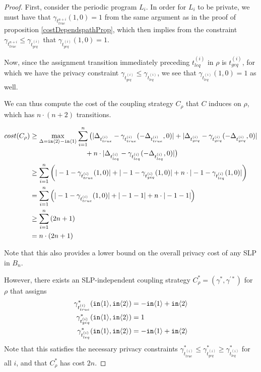 \begin{proof}
    First, consider the periodic program $L_i$. In order for $L_i$ to be private, we must have that $\gamma_{t_{true}^{n + i}}(1, 0) = 1$ from the same argument as in the proof of proposition \ref{costDependspathProp}, which then implies from the constraint $\gamma_{t_{true}^{n + i}} \leq \gamma_{t_{geq}^{(i)}}$ that $\gamma_{t_{geq}^{(i)}}(1, 0) = 1$. 

    Now, since the assignment transition immediately preceding $t_{leq}^{(i)}$ in $\rho$ is $t_{geq}^{(i)}$, for which we have the privacy constraint $\gamma_{t_{geq}^{(i)}} \leq \gamma_{t_{leq}^{(i)}}$, we see that $\gamma_{t_{leq}^{(i)}}(1, 0) = 1$ as well. 

    We can thus compute the cost of the coupling strategy $C_\rho$ that $C$ induces on $\rho$, which has $n \cdot (n + 2)$ transitions. 

    \begin{align*}
        cost(C_\rho) &\geq \max_{\Delta = \texttt{in}\langle2 \rangle - \texttt{in}\langle1 \rangle} \sum_{i=1}^{n} \big(|\Delta_{t_{true}^{(i)}} - \gamma_{t_{true}^{(i)}}(-\Delta_{t_{true}^{(i)}}, 0)| + |\Delta_{t_{geq}^{(i)}} - \gamma_{t_{geq}^{(i)}}(-\Delta_{t_{geq}^{(i)}}, 0)| \\ & \qquad \qquad \qquad \qquad + n \cdot |\Delta_{t_{leq}^{(i)}} - \gamma_{t_{leq}^{(i)}}(-\Delta_{t_{leq}^{(i)}}, 0)|\big)\\
        &\geq \sum_{i = 1}^n \left(|-1 - \gamma_{t_{true}^{(i)}}(1, 0)| + |-1 - \gamma_{t_{geq}^{(i)}}(1, 0)| + n \cdot |-1 - \gamma_{t_{leq}^{(i)}}(1, 0)|\right)\\
        &= \sum_{i = 1}^n \left(|-1 - \gamma_{t_{true}^{(i)}}(1, 0)| + |-1 - 1| + n \cdot |-1 - 1|\right)\\
        &\geq \sum_{i = 1}^n \left(2 n + 1\right)\\
        &= n \cdot (2 n + 1)
    \end{align*} 

    Note that this also provides a lower bound on the overall privacy cost of any SLP in $B_n$. 

    However, there exists an SLP-independent coupling strategy $C_\rho^* = (\gamma^*, \gamma^{'*})$ for $\rho$ that assigns
    \begin{align*}
        \gamma_{t_{true}^{(i)}}^*(\texttt{in}\langle1 \rangle, \texttt{in}\langle2 \rangle) &= -\texttt{in}\langle1 \rangle + \texttt{in}\langle2 \rangle\\
        \gamma_{t_{geq}^{(i)}}^*(\texttt{in}\langle1 \rangle, \texttt{in}\langle2 \rangle) &= 1\\
        \gamma_{t_{leq}^{(i)}}^*(\texttt{in}\langle1 \rangle, \texttt{in}\langle2 \rangle) &= -\texttt{in}\langle1 \rangle + \texttt{in}\langle2 \rangle
    \end{align*}
    Note that this satisfies the necessary privacy constraints $\gamma_{t_{true}^{(i)}}^* \leq \gamma_{t_{geq}^{(i)}}^* \geq \gamma_{t_{leq}^{(i)}}^*$ for all $i$, and that $C_\rho^*$ has cost $2n$.
    

\end{proof}

